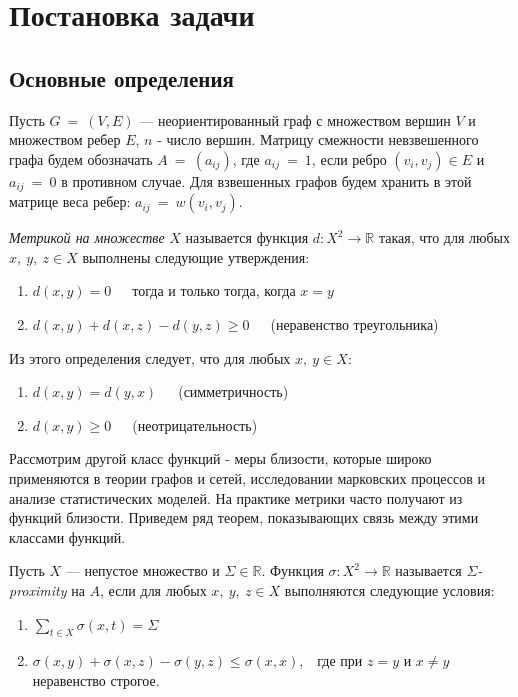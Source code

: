 \chapter{Постановка задачи} \label{chapt1}

\section{Основные определения} \label{sect1_1}

Пусть $G~=~(V, E)$ --- неориентированный граф с множеством вершин $V$ и множеством ребер $E$, $n$ - число вершин. Матрицу смежности невзвешенного графа будем обозначать $A~=~(a_{ij})$, где $a_{ij}~=~1$, если ребро $(v_i, v_j) \in E$ и $a_{ij}~=~0$ в противном случае. Для взвешенных графов будем хранить в этой матрице веса ребер: $a_{ij}~=~w(v_i, v_j)$.

\begin{definition}
\emph{Метрикой на множестве} $X$ называется функция $d: X^2\rightarrow \mathbb{R}$ такая, что для любых $x,\ y,\ z \in X$ выполнены следующие утверждения:
\begin{enumerate}
\item $d(x,y) = 0$\ \ \  тогда и только тогда, когда $x=y$
\item $d(x,y) + d(x,z) - d(y,z) \ge 0$\ \ \  (неравенство треугольника)
\end{enumerate}
\end{definition}

Из этого определения следует, что для любых $x,\ y \in X$:

\begin{enumerate}
\item $d(x,y) = d(y,x)$\ \ \ (симметричность)
\item $d(x,y) \ge 0$\ \ \  (неотрицательность)
\end{enumerate}


Рассмотрим другой класс функций - меры близости, которые широко применяются в теории графов и сетей, исследовании марковских процессов и анализе статистических моделей. На практике метрики часто получают из функций близости. Приведем ряд теорем, показывающих связь между этими классами функций.

\begin{definition}
Пусть $X$ --- непустое множество и $\Sigma \in \mathbb{R}$. Функция $\sigma: X^2 \rightarrow \mathbb{R}$ называется $\Sigma$\emph{-proximity} на $A$, если для любых $x,\ y,\ z \in X$ выполняются следующие условия:
\begin{enumerate}
\item $\sum\limits_{t \in X} \sigma (x,t) = \Sigma$
\item $\sigma(x,y) + \sigma(x,z) - \sigma(y,z) \le \sigma(x,x)$,\ \  где при $z = y$ и $x \ne y$ неравенство строгое.
\end{enumerate}
\end{definition}

